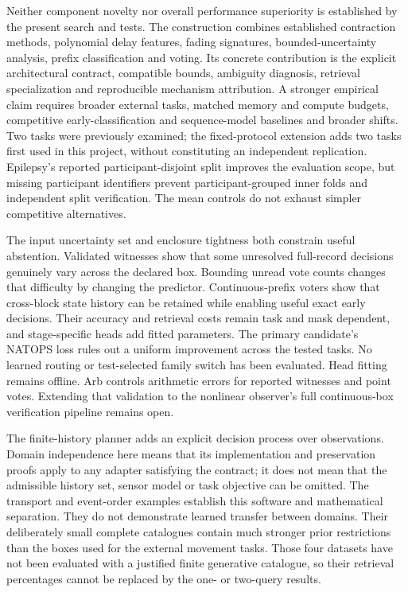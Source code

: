 \documentclass[11pt,a4paper]{article}
\theoremstyle{definition}\newtheorem{definition}[theorem]{Definition}
\begin{document}
Neither component novelty nor overall performance superiority is established by the present search and tests. The construction combines established contraction methods, polynomial delay features, fading signatures, bounded-uncertainty analysis, prefix classification and voting. Its concrete contribution is the explicit architectural contract, compatible bounds, ambiguity diagnosis, retrieval specialization and reproducible mechanism attribution. A stronger empirical claim requires broader external tasks, matched memory and compute budgets, competitive early-classification and sequence-model baselines and broader shifts. Two tasks were previously examined; the fixed-protocol extension adds two tasks first used in this project, without constituting an independent replication. Epilepsy's reported participant-disjoint split improves the evaluation scope, but missing participant identifiers prevent participant-grouped inner folds and independent split verification. The mean controls do not exhaust simpler competitive alternatives.

The input uncertainty set and enclosure tightness both constrain useful abstention. Validated witnesses show that some unresolved full-record decisions genuinely vary across the declared box. Bounding unread vote counts changes that difficulty by changing the predictor. Continuous-prefix voters show that cross-block state history can be retained while enabling useful exact early decisions. Their accuracy and retrieval costs remain task and mask dependent, and stage-specific heads add fitted parameters. The primary candidate's NATOPS loss rules out a uniform improvement across the tested tasks. No learned routing or test-selected family switch has been evaluated. Head fitting remains offline. Arb controls arithmetic errors for reported witnesses and point votes. Extending that validation to the nonlinear observer's full continuous-box verification pipeline remains open.

The finite-history planner adds an explicit decision process over observations. Domain independence here means that its implementation and preservation proofs apply to any adapter satisfying the contract; it does not mean that the admissible history set, sensor model or task objective can be omitted. The transport and event-order examples establish this software and mathematical separation. They do not demonstrate learned transfer between domains. Their deliberately small complete catalogues contain much stronger prior restrictions than the boxes used for the external movement tasks. Those four datasets have not been evaluated with a justified finite generative catalogue, so their retrieval percentages cannot be replaced by the one- or two-query results.
\end{document}
